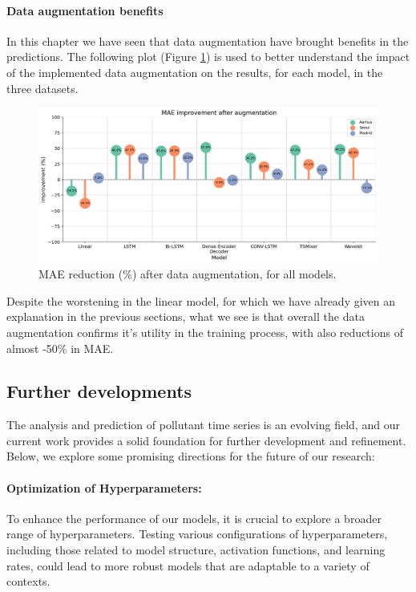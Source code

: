 \paragraph{Data augmentation benefits}

In this chapter we have seen that data augmentation have brought benefits in the predictions. The following plot (Figure \ref{fig:augmentation-improv}) is used to better understand the impact of the implemented data augmentation on the results, for each model, in the three datasets.

\begin{figure}[h]
    \centering
    \includegraphics[width=1\linewidth]{images/Results/improvement with augmentation.png}
    \caption{MAE reduction (\%) after data augmentation, for all models.}
    \label{fig:augmentation-improv}
\end{figure}

Despite the worstening in the linear model, for which we have already given an explanation in the previous sections, what we see is that overall the data augmentation confirms it's utility in the training process, with also reductions of almost -50\% in MAE. 

\subsection*{Further developments}

The analysis and prediction of pollutant time series is an evolving field, and our current work provides a solid foundation for further development and refinement. Below, we explore some promising directions for the future of our research:

\paragraph{Optimization of Hyperparameters:}
To enhance the performance of our models, it is crucial to explore a broader range of hyperparameters. Testing various configurations of hyperparameters, including those related to model structure, activation functions, and learning rates, could lead to more robust models that are adaptable to a variety of contexts.

